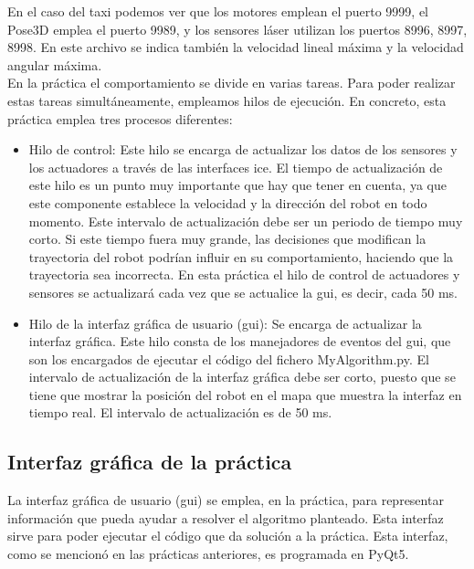 En el caso del taxi podemos ver que los motores emplean el puerto 9999, el Pose3D emplea el puerto 9989, y los sensores láser utilizan los puertos 8996, 8997, 8998. En este archivo se indica también la velocidad lineal máxima y la velocidad angular máxima.\\

En la práctica el comportamiento se divide en varias tareas. Para poder realizar estas tareas simultáneamente, empleamos hilos de ejecución. En concreto, esta práctica emplea tres procesos diferentes:

\begin{itemize}
\item Hilo de control: Este hilo se encarga de actualizar los datos de los sensores y los actuadores a través de las interfaces \acrshort{ice}. El tiempo de actualización de este hilo es un punto muy importante que hay que tener en cuenta, ya que este componente establece la velocidad y la dirección del robot en todo momento. Este intervalo de actualización debe ser un periodo de tiempo muy corto. Si este tiempo fuera muy grande, las decisiones que modifican la trayectoria del robot podrían influir en su comportamiento, haciendo que la trayectoria sea incorrecta. En esta práctica el hilo de control de actuadores y sensores se actualizará cada vez que se actualice la \acrshort{gui}, es decir, cada 50 ms.
\item	Hilo de la interfaz gráfica de usuario (\acrshort{gui}): Se encarga de actualizar la interfaz gráfica. Este hilo consta de los manejadores de eventos del \acrshort{gui}, que son los encargados de ejecutar el código del fichero MyAlgorithm.py. El intervalo de actualización de la interfaz gráfica debe ser corto, puesto que se tiene que mostrar la posición del robot en el mapa que muestra la interfaz en tiempo real. El intervalo de actualización es de 50 ms.

\end{itemize}

\subsection{Interfaz gráfica de la práctica}
La interfaz gráfica de usuario (\acrshort{gui}) se emplea, en la práctica, para representar información que pueda ayudar a resolver el algoritmo planteado. Esta interfaz sirve para poder ejecutar el código que da solución a la práctica. Esta interfaz, como se mencionó en las prácticas anteriores, es programada en PyQt5.\\


